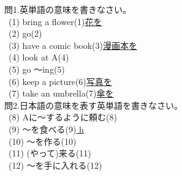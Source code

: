 \documentclass[uplatex]{jsarticle}
\title{\vspace{-30mm}\flushleft{\huge{第1回\ (\ \ 月\ \ 日)\ Unit1〜2}}}
\author{\Large{\hspace{90mm}名前\hspace{40mm}得点\hspace{20mm}点}}
\date{\empty}
\begin{document}
\maketitle
\vspace{-10mm}
\Large 問1.英単語の意味を書きなさい。\\
\large\ (1) bring a flower\hspace{10mm}\hspace{\fill}(1)\underline{花を\hspace{27mm}}\\
\ (2) go\hspace{\fill}(2)\underline{\hspace{35mm}}\\
\ (3) have a comic book\hspace{\fill}(3)\underline{漫画本を\hspace{19mm}}\\
\ (4) look at A\hspace{\fill}(4)\underline{\hspace{35mm}}\\
\ (5) go 〜ing\hspace{\fill}(5)\underline{\hspace{35mm}}\\
\ (6) keep a picture\hspace{\fill}(6)\underline{写真を\hspace{23mm}}\\
\ (7) take an umbrella\hspace{\fill}(7)\underline{傘を\hspace{27mm}}\\
\Large 問2.日本語の意味を表す英単語を書きなさい。\\
\large\ (8) Aに〜するように頼む\hspace{\fill}(8)\underline{\hspace{35mm}}\\
\ (9) 〜を食べる\hspace{\fill}(9)\underline{ h\hspace{32mm}}\\
\ (10) 〜を作る\hspace{\fill}(10)\underline{\hspace{35mm}}\\
\ (11) (やって)来る\hspace{\fill}(11)\underline{\hspace{35mm}}\\
\ (12) 〜を手に入れる\hspace{\fill}(12)\underline{\hspace{35mm}}\\
\end{document}
